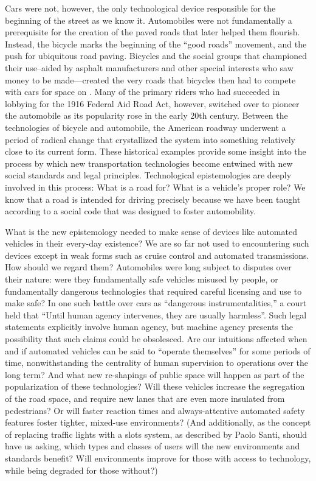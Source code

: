 Cars were not, however, the only technological device responsible for
the beginning of the street as we know it.
Automobiles were not fundamentally a prerequisite for the creation of the paved
roads that later helped them flourish. Instead, the bicycle marks the
beginning of the ``good roads'' movement, and the push for ubiquitous
road
paving\cite{???-http://www.vox.com/2015/3/19/8253035/roads-cyclists-cars-history}.
Bicycles and the social groups that championed their use--aided by
asphalt manufacturers and other special interests who saw money to be made---created the
very roads that bicycles then had to compete with cars for space on
\cite{???-vox2}. Many of the primary riders who had succeeded in lobbying for
the 1916 Federal Aid Road Act, however, switched over to pioneer the
automobile as its popularity rose in the early 20th century. Between
the technologies of bicycle and automobile, the American roadway
underwent a period of radical change that crystallized the system into
something relatively close to its current form. These historical
examples provide some insight into the process by which new
transportation technologies become entwined with new social standards
and legal principles. Technological epistemologies are deeply involved
in this process: What is a road for? What is a vehicle's
proper role? We know that a road is intended for driving precisely
because we have been taught according to a social code that was
designed to foster automobility.

What is the new epistemology needed to make sense of devices like
automated vehicles in their every-day existence? We are so far not
used to encountering such devices
except in weak forms such as cruise control and automated
transmissions. How should we regard them?
Automobiles were long subject to disputes over their nature: were they
fundamentally safe vehicles misused by people, or fundamentally
dangerous technologies that required careful licensing and use to
make safe? In one such battle over cars as ``dangerous
instrumentalities,'' a court held that ``Until human agency intervenes, they are usually
harmless''\cite[p. 10]{???-lochlannjain}. Such legal statements
explicitly involve human agency, but machine agency presents the
possibility that such claims could be obsolesced. Are our intuitions
affected when and if automated vehicles can be said to ``operate
themselves'' for some periods of time, nonwithstanding the centrality
of human supervision to operations over the long term?
And what new re-shapings of public space will happen as part of the 
popularization of these technologies? Will these vehicles increase the
segregation of the road space, and require new lanes that are even
more insulated from pedestrians? Or will faster reaction times and
always-attentive automated safety features foster tighter, mixed-use
environments? (And additionally, as the concept of replacing traffic
lights with a slots system, as described by Paolo Santi, should have
us asking, which types and classes of users will the new environments
and standards benefit? Will environments improve for those with access
to technology, while being degraded for those without?) 

